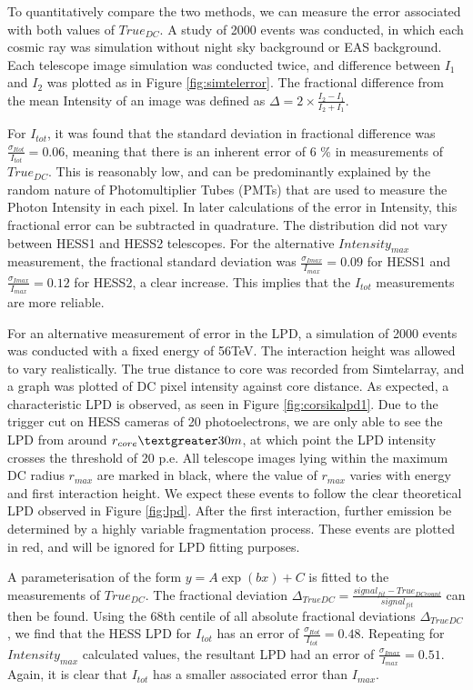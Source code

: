 \documentclass[11pt]{article}
\begin{document}
To quantitatively compare the two methods, we can measure the error associated with both values of $True_{DC}$. A study of 2000 events was conducted, in which each cosmic ray was simulation without night sky background or EAS background. Each telescope image simulation was conducted twice, and difference between $I_{1}$ and $I_{2}$ was plotted as in Figure \ref{fig:simtelerror}. The fractional difference from the mean Intensity of an image was defined as $\Delta = 2 \times \frac{I_{2} - I_{1}}{{I_{2} + I_{1}}}$. 

For $I_{tot}$, it was found that the standard deviation in fractional difference was $\frac{\sigma_{Itot}}{I_{tot}}=0.06$, meaning that there is an inherent error of 6 \% in measurements of $True_{DC}$. This is reasonably low, and can be predominantly explained by the random nature of Photomultiplier Tubes (PMTs) that are used to measure the Photon Intensity in each pixel. In later calculations of the error in Intensity, this fractional error can be subtracted in quadrature. The distribution did not vary between HESS1 and HESS2 telescopes. For the alternative $Intensity_{max}$ measurement, the fractional standard deviation was $\frac{\sigma_{Imax}}{I_{max}}=0.09$ for HESS1 and $\frac{\sigma_{Imax}}{I_{max}}=0.12$ for HESS2, a clear increase. This implies that the $I_{tot}$ measurements are more reliable.

For an alternative measurement of error in the LPD, a simulation of 2000 events was conducted with a fixed energy of 56TeV. The interaction height was allowed to vary realistically. The true distance to core was recorded from Sim\textunderscore telarray, and a graph was plotted of DC pixel intensity against core distance. As expected, a characteristic LPD is observed, as seen in Figure \ref{fig:corsikalpd1}. Due to the trigger cut on HESS cameras of 20 photoelectrons, we are only able to see the LPD from around $r_{core} \textgreater 30m$, at which point the LPD intensity crosses the threshold of 20 p.e. All telescope images lying within the maximum DC radius $r_{max}$ are marked in black, where the value of $r_{max}$ varies with energy and first interaction height. We expect these events to follow the clear theoretical LPD observed in Figure \ref{fig:lpd}. After the first interaction, further emission be determined by a highly variable fragmentation process. These events are plotted in red, and will be ignored for LPD fitting purposes. 

A parameterisation of the form $y = A \exp (b x) + C $ is fitted to the measurements of $True_{DC}$. The fractional deviation $\Delta_{TrueDC} = \frac{signal_{fit} - True_{DC count}}{signal_{fit}}$ can then be found. Using the 68th centile of all absolute fractional deviations $\Delta_{TrueDC}$, we find that the HESS LPD for $I_{tot}$ has an error of $\frac{\sigma_{Itot}}{I_{tot}}=0.48$. Repeating for $Intensity_{max}$ calculated values, the resultant LPD had an error of $\frac{\sigma_{Imax}}{I_{max}} = 0.51$. Again, it is clear that $I_{tot}$ has a smaller associated error than $I_{max}$.
\end{document}
